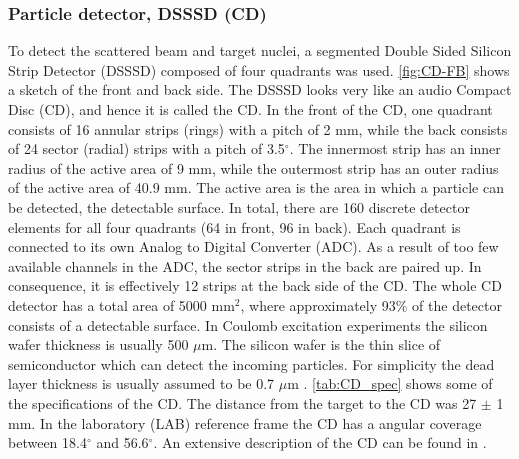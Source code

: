 \documentclass[twoside,english]{uiofysmaster/uiofysmaster}
\let\orgautoref\autoref
\renewcommand{\autoref}
        {%
		 \def\subsectionautorefname{Section}%
		 \def\subsubsectionautorefname{Section}%
          \orgautoref}
\begin{document}
\subsubsection{Particle detector, DSSSD (CD)}
To detect the scattered beam and target nuclei, a segmented Double Sided Silicon Strip Detector (DSSSD) composed of four quadrants was used. 
\autoref{fig:CD-FB} shows a sketch of the front and back side. 
The DSSSD looks very like an audio Compact Disc (CD), and hence it is called the CD. 
In the front of the CD, one quadrant consists of 16 annular strips (rings) with a pitch of 2 mm, while the back consists of 24 sector (radial) strips with a pitch of 3.5$^\circ$. 
The innermost strip has an inner radius of the active area of 9 mm, while the outermost strip has an outer radius of the active area of 40.9 mm. 
The active area is the area in which a particle can be detected, the detectable surface. 
In total, there are 160 discrete detector elements for all four quadrants (64 in front, 96 in back). 
Each quadrant is connected to its own Analog to Digital Converter (ADC). 
As a result of too few available channels in the ADC, the sector strips in the back are paired up.
In consequence, it is effectively 12 strips at the back side of the CD. 
The whole CD detector has a total area of 5000 mm$^2$, where approximately 93$\%$ of the detector consists of a detectable surface. 
In Coulomb excitation experiments the silicon wafer thickness is usually 500 $\mu$m.
The silicon wafer is the thin slice of semiconductor which can detect the incoming particles. 
For simplicity the dead layer thickness is usually assumed to be 0.7 $\mu$m \cite{NWarr-CD, MB-spect}. 
\autoref{tab:CD_spec} shows some of the specifications of the CD.  
The distance from the target to the CD was 27 $\pm$ 1 mm. 
In the laboratory (LAB) reference frame the CD has a angular coverage between 18.4$^\circ$ and 56.6$^\circ$. An extensive description of the CD can be found in \cite{CD-DSSSD}.

\end{document}
